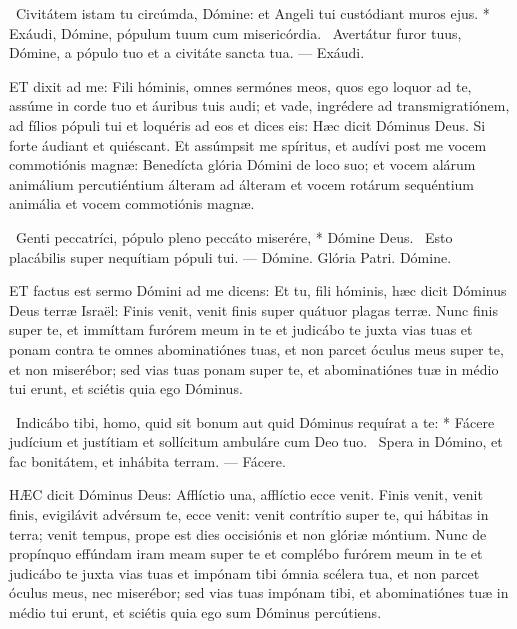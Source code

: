 \R\ Civitátem istam tu circúmda, Dómine: et Angeli tui custódiant muros ejus. * Exáudi, Dómine, pópulum tuum cum misericórdia. \V\ Avertátur furor tuus, Dómine, a pópulo tuo et a civitáte sancta tua. — Exáudi.



\lettrine[lines=2]{E}{T} dixit ad me: Fili hóminis, omnes sermónes meos, quos ego loquor ad te, assúme in corde tuo et áuribus tuis audi; et vade, ingrédere ad transmigratiónem, ad fílios pópuli tui et loquéris ad eos et dices eis: Hæc dicit Dóminus Deus. Si forte áudiant et quiéscant. Et assúmpsit me spíritus, et audívi post me vocem commotiónis magnæ: Benedícta glória Dómini de loco suo; et vocem alárum animálium percutiéntium álteram ad álteram et vocem rotárum sequéntium animália et vocem commotiónis magnæ.

\R\ Genti peccatríci, pópulo pleno peccáto miserére, * Dómine Deus. \V\ Esto placábilis super nequítiam pópuli tui. — Dómine. Glória Patri. Dómine.




\lettrine[lines=2]{E}{T} factus est sermo Dómini ad me dicens: Et tu, fili hóminis, hæc dicit Dóminus Deus terræ Israël: Finis venit, venit finis super quátuor plagas terræ. Nunc finis super te, et immíttam furórem meum in te et judicábo te juxta vias tuas et ponam contra te omnes abominatiónes tuas, et non parcet óculus meus super te, et non miserébor; sed vias tuas ponam super te, et abominatiónes tuæ in médio tui erunt, et sciétis quia ego Dóminus.

\R\ Indicábo tibi, homo, quid sit bonum aut quid Dóminus requírat a te: * Fácere judícium et justítiam et sollícitum ambuláre cum Deo tuo. \V\ Spera in Dómino, et fac bonitátem, et inhábita terram. — Fácere.


\lettrine[lines=2]{H}{ÆC} dicit Dóminus Deus: Afflíctio una, afflíctio ecce venit. Finis venit, venit finis, evigilávit advérsum te, ecce venit: venit contrítio super te, qui hábitas in terra; venit tempus, prope est dies occisiónis et non glóriæ móntium. Nunc de propínquo effúndam iram meam super te et complébo furórem meum in te et judicábo te juxta vias tuas et impónam tibi ómnia scélera tua, et non parcet óculus meus, nec miserébor; sed vias tuas impónam tibi, et abominatiónes tuæ in médio tui erunt, et sciétis quia ego sum Dóminus percútiens.

